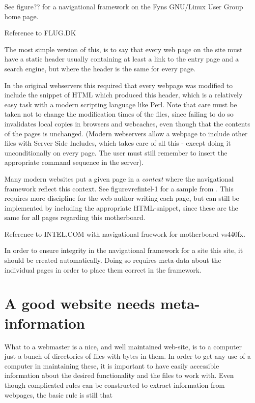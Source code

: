 See figure\textsf{??} for a navigational framework on the Fyns
GNU/Linux User Group home page.

\textsf{Reference to FLUG.DK}

The most simple version of this, is to say that every web page on the
site must have a static header usually containing at least a link to the entry
page and a search engine, but where the header is the same for every
page.

In the original webservers this required that every webpage was
modified to include the snippet of HTML which produced this header,
which is a relatively easy task with a modern scripting language like
Perl.  Note that care must be taken not to change the modification times of the
files, since failing to do so invalidates local copies in browsers
and webcaches, even though that the contents of the pages \textsf{is}
unchanged.  (Modern webservers allow a webpage to include other files
with \textsf{Server Side Includes}, which takes care of all this - except
doing it unconditionally on every page.  The user must still remember
to insert the appropriate command sequence in the server).

Many modern websites put a given page in a \textit{context} where the
navigational framework reflect this context.  See
figure\textsf{vref{intel-1}} for a sample from
.    This requires more discipline for the web author
writing each page,
but can still be implemented by including the appropriate
HTML-snippet, since these are the same for all pages regarding this
motherboard.  

\textsf{Reference to INTEL.COM with navigational fraework for
  motherboard vs440fx}.

In order to ensure integrity in the navigational framework for a site
this site, it should be created automatically.  Doing so requires
meta-data about the individual pages in order to place them correct in
the framework.

\section{A good website needs meta-information}

What to a webmaster is a nice, and well maintained web-site, is to a
computer just a bunch of directories of files with bytes in them.  In
order to get any use of a computer in maintaining these, it is
important to have easily accessible information about the desired
functionality and the files to work with.  Even though complicated
rules can be constructed to extract information from webpages, the
basic rule is still that

